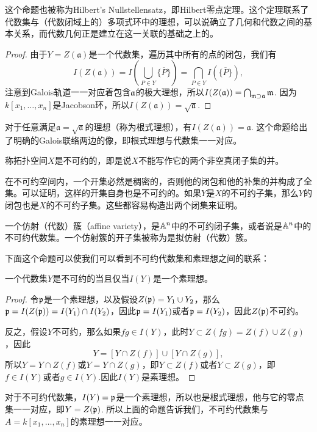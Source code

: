 这个命题也被称为Hilbert's Nullstellensatz，即Hilbert零点定理。这个定理联系了代数集与（代数闭域上的）多项式环中的理想，可以说确立了几何和代数之间的基本关系，而代数几何正是建立在这一关联的基础之上的。

\begin{proof} 由于$Y=Z(\mathfrak{a})$是一个代数集，遍历其中所有的点的闭包，我们有
    \[
        I(Z(\mathfrak{a}))=I\left(\bigcup_{P\in Y}\overline{\{P\}}\right)=\bigcap_{P\in Y}I\left(\overline{\{P\}}\right),
    \]
    注意到Galois轨道一一对应着包含$\mathfrak{a}$的极大理想，所以$I(Z(\mathfrak{a}))=\bigcap_{\mathfrak{m}\supset \mathfrak{a}}\mathfrak{m}$. 因为$k[x_1,\dots,x_n]$是Jacobson环，所以$I(Z(\mathfrak{a}))=\sqrt{\mathfrak{a}}$. \end{proof}

对于任意满足$\mathfrak{a}=\sqrt{\mathfrak{a}}$的理想（称为根式理想），有$I(Z(\mathfrak{a}))=\mathfrak{a}$. 这个命题给出了明确的Galois联络两边的像，即根式理想与代数集一一对应。

\para 称拓扑空间$X$是不可约的，即是说$X$不能写作它的两个非空真闭子集的并。

在不可约空间内，一个开集必然是稠密的，否则他的闭包和他的补集的并构成了全集。可以证明，这样的开集自身也是不可约的。如果$Y$是$X$的不可约子集，那么$Y$的闭包也是$X$的不可约子集。这些都容易构造出两个闭集来证明。

\para 一个仿射（代数）簇（affine variety），是$\mathbb{A}^n$中的不可约闭子集，或者说是$\mathbb{A}^n$中的不可约代数集。一个仿射簇的开子集被称为是拟仿射（代数）簇。

下面这个命题可以使我们可以看到不可约代数集和素理想之间的联系：

\begin{pro}
    一个代数集$Y$是不可约的当且仅当$I(Y)$是一个素理想。
\end{pro}

\begin{proof} 令$\mathfrak{p}$是一个素理想，以及假设$Z(\mathfrak{p})=Y_1\cup Y_2$，那么$\mathfrak{p}=I(Z(\mathfrak{p}))=I(Y_1)\cap I(Y_2)$，因此$\mathfrak{p}=I(Y_1)$或者$\mathfrak{p}=I(Y_2)$，因此$Z(\mathfrak{p})$不可约。

    反之，假设$Y$不可约，那么如果$fg\in I(Y)$，此时$Y\subset Z(fg)=Z(f)\cup Z(g)$，因此
    \[
        Y=[Y\cap Z(f)]\cup [Y\cap Z(g)],
    \]
    所以$Y=Y\cap Z(f)$或$Y=Y\cap Z(g)$，即$Y\subset Z(f)$或者$Y\subset Z(g)$，即$f\in I(Y)$或者$g\in I(Y)$.因此$I(Y)$是素理想。\end{proof}

对于不可约代数集，$I(Y)=\mathfrak{p}$是一个素理想，所以也是根式理想，他与它的零点集一一对应，即$Y=Z(\mathfrak{p})$. 所以上面的命题告诉我们，不可约代数集与$A=k[x_1,\dots,x_n]$的素理想一一对应。

